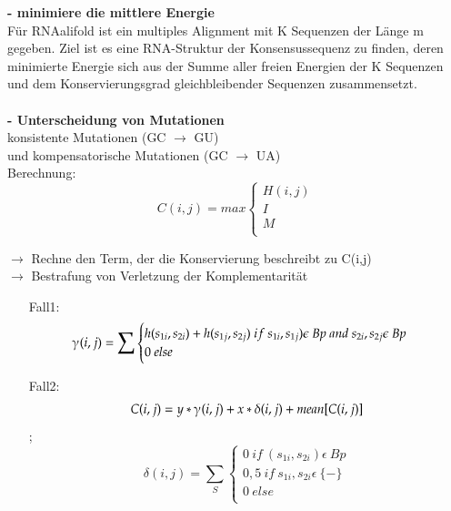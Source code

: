\textbf{- minimiere die mittlere Energie} \\
Für RNAalifold ist ein multiples Alignment mit K Sequenzen der Länge m gegeben. Ziel ist es eine RNA-Struktur der Konsensussequenz zu finden, deren minimierte Energie sich aus der Summe aller freien Energien der K Sequenzen und dem Konservierungsgrad gleichbleibender Sequenzen zusammensetzt.\\
\\
\textbf{- Unterscheidung von Mutationen} \\
konsistente Mutationen (GC $\rightarrow$ GU) \\
und kompensatorische Mutationen (GC $\rightarrow$ UA) \\ 

Berechnung:
\begin{equation}
C(i,j)= max
\begin{cases} 
H(i,j)\\ 
I\\ 
M\\
\end{cases}
\end{equation}

$\rightarrow$  Rechne den Term, der die Konservierung beschreibt zu C(i,j) \\
$\rightarrow$ Bestrafung von Verletzung der Komplementarität\\
\begin{itemize}
	\item[Fall1:] 
	\begin{equation}
	\gammaup(i,j)= \sum 
	\begin{cases} 
	h(s_{1i},s_{2i}) + h(s_{1j},s_{2j}) \ if\ s_{1i},s_{1j}) \epsilon\ Bp \ and \ s_{2i},s_{2j} \epsilon\ Bp \\
	0 \ else\\
	\end{cases} 
	\end{equation}	
	\item [Fall2:] 
	\begin{equation} 
	C(i,j)= y * \gammaup (i,j) + x * \delta (i,j)+ mean[C(i,j)]  
	\end{equation} ;
	\begin{equation}	 
	\delta(i,j)= \sum_{S} 
	\begin{cases} 
	0 \ if\ (s_{1i},s_{2i}) \epsilon\ Bp \\
	0,5 \ if\ s_{1i},s_{2i} \epsilon\ \{-\} \\ 
	0 \ else\\
	\end{cases}
	\end{equation}
\end{itemize}

